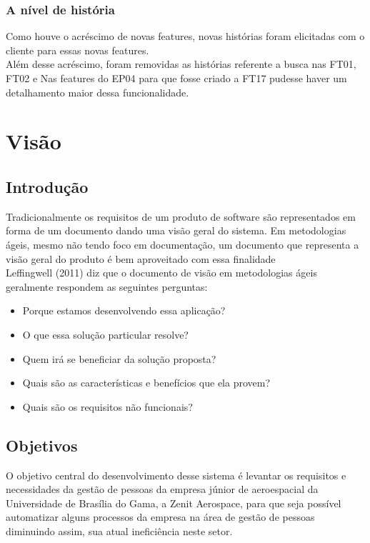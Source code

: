 \begin{anexosenv}
\subsection[A nível de história]{A nível de história}

Como houve o acréscimo de novas features, novas histórias foram elicitadas com o cliente para essas novas features.\\
Além desse acréscimo, foram removidas as histórias referente a busca nas FT01, FT02  e Nas features do EP04 para que fosse criado a FT17 pudesse haver um detalhamento maior dessa funcionalidade.\\

\chapter[Visão]{Visão}

\section[Introdução]{Introdução}

Tradicionalmente os requisitos de um produto de software são representados em forma de um documento dando uma visão geral do sistema. Em metodologias ágeis, mesmo não tendo foco em documentação, um documento que representa a visão geral do produto é bem aproveitado com essa finalidade \cite{leffingwell2011}\\

Leffingwell (2011) diz que o documento de visão em metodologias ágeis geralmente respondem as seguintes perguntas:
\begin{itemize}
    \item Porque estamos desenvolvendo essa aplicação?
    \item O que essa solução particular resolve?
    \item Quem irá se beneficiar da solução proposta?
    \item Quais são as características e benefícios que ela provem?
    \item Quais são os requisitos não funcionais?
\end{itemize}

\section[Objetivos]{Objetivos}

O objetivo central do desenvolvimento desse sistema é levantar os requisitos e necessidades da gestão de pessoas da empresa júnior de aeroespacial da Universidade de Brasília do Gama, a Zenit Aerospace, para que seja possível automatizar alguns processos da empresa na área de gestão de pessoas diminuindo assim, sua atual ineficiência neste setor.\\


\end{anexosenv}
